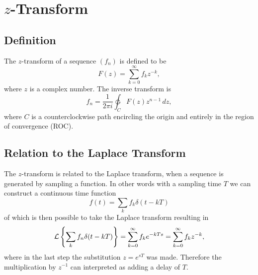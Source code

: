 
\section{\(z\)-Transform}

\subsection{Definition}

The \(z\)-transform of a sequence \((f_n)\) is defined to be
\[
	F(z) = \sum_{k = 0}^\infty f_k z^{-k},
\]
where \(z\) is a complex number. The inverse transform is
\[
	f_n = \frac{1}{2\pi i} \ointctrclockwise_C F(z) z^{n-1} \, dz,
\]
where \(C\) is a counterclockwise path encircling the origin and entirely in the region of convergence (ROC).

\subsection{Relation to the Laplace Transform}

The \(z\)-transform is related to the Laplace transform, when a sequence is generated by sampling a function. In other words with a sampling time \(T\) we can construct a continuous time function
\[
	f(t) = \sum_k f_k \delta(t - kT)
\]
of which is then possible to take the Laplace transform resulting in
\[
	\operatorname{\mathcal{L}} \left\{ \sum_k f_n \delta(t - kT) \right\}
	= \sum_{k=0}^\infty f_k e^{-kTs}
	= \sum_{k=0}^\infty f_k z^{-k},
\]
where in the last step the substitution \(z = e^{sT}\) was made. Therefore the multiplication by \(z^{-1}\) can interpreted as adding a delay of \(T\).
